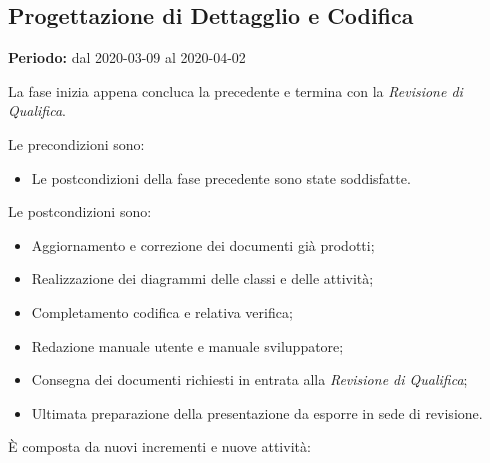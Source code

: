 \subsection{Progettazione di Dettagglio e Codifica}
\label{progettazione_di_dettaglio}
\textbf{Periodo:} dal 2020-03-09 al 2020-04-02 

La fase inizia appena concluca la precedente e termina con la \textit{Revisione di Qualifica}. 

Le precondizioni sono:
\begin{itemize}
    \item Le postcondizioni della fase precedente sono state soddisfatte.
\end{itemize}

Le postcondizioni sono:
\begin{itemize}
    \item Aggiornamento e correzione dei documenti già prodotti;
    \item Realizzazione dei diagrammi delle classi e delle attività;
    \item Completamento codifica e relativa verifica;
    \item Redazione manuale utente e manuale sviluppatore;
    \item Consegna dei documenti richiesti in entrata alla \textit{Revisione di Qualifica};
    \item Ultimata preparazione della presentazione da esporre in sede di revisione.
\end{itemize}

È composta da nuovi incrementi e nuove attività:

